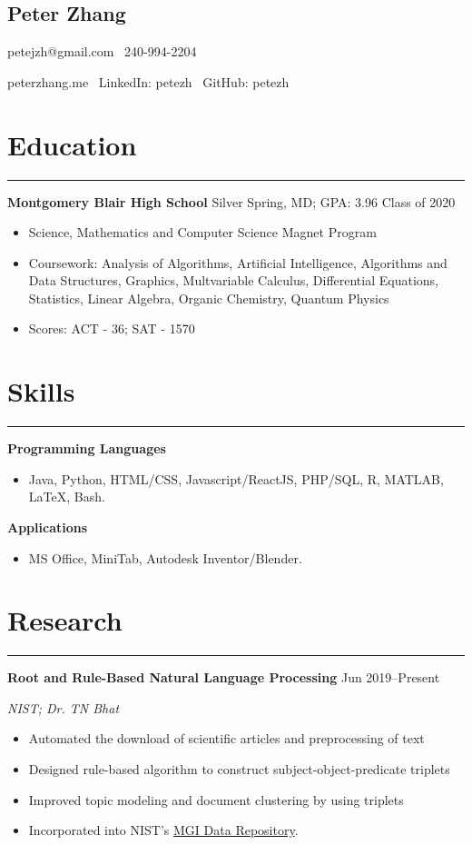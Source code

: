 \documentclass[11pt]{article}
\newcommand{\name}[1]{\begin{center}\section*{\huge \color{highlight} #1}\end{center}}
\newcommand{\topinfo}[1]{\begin{center}\vspace{-0.2cm}#1\vspace{-0.2cm}\end{center}}
\newcommand{\resumesection}[1]{\vspace{-0.3cm}\section*{\color{highlight}#1}\vspace{-0.3cm}\hrule\vspace{0.3cm}}
\begin{document}
\name{Peter Zhang}
\topinfo{petejzh@gmail.com  \textbullet\ 240-994-2204}
\topinfo{peterzhang.me \textbullet\ LinkedIn: petezh \textbullet\ GitHub: petezh}


\resumesection{Education}

\textbf{Montgomery Blair High School} Silver Spring, MD; GPA: 3.96 \hfill Class of 2020

\begin{itemize}
	\item Science, Mathematics and Computer Science Magnet Program
	\item Coursework: Analysis of Algorithms, Artificial Intelligence, Algorithms and Data Structures, Graphics, Multvariable Calculus, Differential Equations, Statistics, Linear Algebra, Organic Chemistry, Quantum Physics
	\item Scores: ACT - 36; SAT - 1570
\end{itemize}


\resumesection{Skills}

\textbf{Programming Languages}
\begin{itemize} 
	\item Java, Python, HTML/CSS, Javascript/ReactJS, PHP/SQL, R, MATLAB, \LaTeX, Bash.
\end{itemize}\vspace{0.1cm}

\textbf{Applications}
\begin{itemize} 
	\item MS Office, MiniTab, Autodesk Inventor/Blender.
\end{itemize}

\resumesection{Research}

\textbf{Root and Rule-Based Natural Language Processing}  \hfill Jun 2019--Present\par
\textit{NIST; Dr. TN Bhat}
\begin{itemize}
	\item Automated the download of scientific articles and preprocessing of text
	\item Designed rule-based algorithm to construct subject-object-predicate triplets
	\item Improved topic modeling and document clustering by using triplets
	\item Incorporated into NIST's \href{https://randr.nist.gov/mgi/default.aspx}{MGI Data Repository}.
\end{itemize}\vspace{0.1cm}
\end{document}
